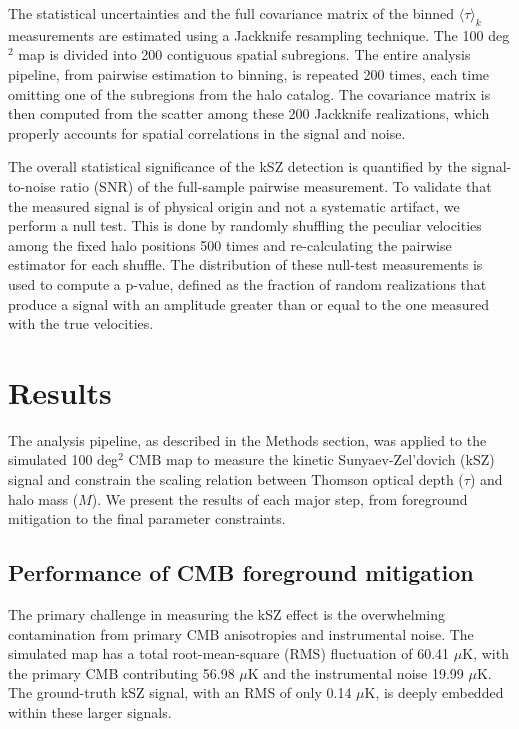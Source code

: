 \documentclass[]{article}
\begin{document}
The statistical uncertainties and the full covariance matrix of the binned $\langle \tau \rangle_k$ measurements are estimated using a Jackknife resampling technique. The 100 deg$^2$ map is divided into 200 contiguous spatial subregions. The entire analysis pipeline, from pairwise estimation to binning, is repeated 200 times, each time omitting one of the subregions from the halo catalog. The covariance matrix is then computed from the scatter among these 200 Jackknife realizations, which properly accounts for spatial correlations in the signal and noise.

The overall statistical significance of the kSZ detection is quantified by the signal-to-noise ratio (SNR) of the full-sample pairwise measurement. To validate that the measured signal is of physical origin and not a systematic artifact, we perform a null test. This is done by randomly shuffling the peculiar velocities among the fixed halo positions 500 times and re-calculating the pairwise estimator for each shuffle. The distribution of these null-test measurements is used to compute a p-value, defined as the fraction of random realizations that produce a signal with an amplitude greater than or equal to the one measured with the true velocities.

\section{Results}
\label{sec:results}
The analysis pipeline, as described in the Methods section, was applied to the simulated 100 deg$^2$ CMB map to measure the kinetic Sunyaev-Zel'dovich (kSZ) signal and constrain the scaling relation between Thomson optical depth ($\tau$) and halo mass ($M$). We present the results of each major step, from foreground mitigation to the final parameter constraints.

\subsection{Performance of CMB foreground mitigation}

The primary challenge in measuring the kSZ effect is the overwhelming contamination from primary CMB anisotropies and instrumental noise. The simulated map has a total root-mean-square (RMS) fluctuation of 60.41 $\mu$K, with the primary CMB contributing 56.98 $\mu$K and the instrumental noise 19.99 $\mu$K. The ground-truth kSZ signal, with an RMS of only 0.14 $\mu$K, is deeply embedded within these larger signals.
\end{document}
